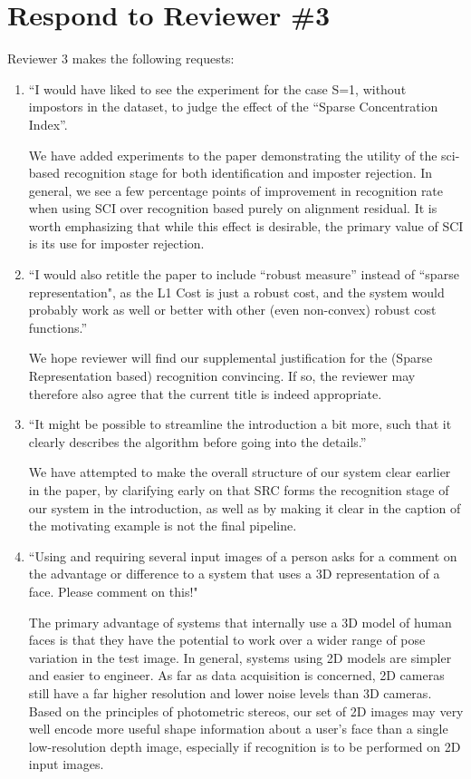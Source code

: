 \documentclass[11pt]{article}
\begin{document}
\section{Respond to Reviewer \#3}
Reviewer 3 makes the following requests:

\begin{enumerate}
\item ``I would have liked to see the experiment for the case S=1, without
impostors in the dataset, to judge the effect of the ``Sparse
Concentration Index''.

We have added experiments to the paper demonstrating the utility of the
sci-based recognition stage for both identification and imposter rejection.  In
general, we see a few percentage points of improvement in recognition rate when
using SCI over recognition based purely on alignment residual.  
It is worth emphasizing that while this effect is desirable, 
the primary value of SCI is its use for imposter rejection. 

\item ``I would also retitle the paper to include ``robust measure''
instead of ``sparse representation", as the L1 Cost is just a robust
cost, and the system would probably work as well or better with other
(even non-convex) robust cost functions.''

We hope reviewer will find our supplemental justification for the (Sparse
Representation based) recognition convincing.  If so, the reviewer may
therefore also agree that the current title is indeed appropriate.

\item ``It might be possible to streamline the introduction a bit more, such that it
clearly describes the algorithm before going into the details.''

We have attempted to make the overall structure of our system clear earlier in the
paper, by clarifying early on that SRC forms the recognition stage of our system
in the introduction, as well as by making it clear in the caption of the motivating example
is not the final pipeline.

\item ``Using and requiring several input images of a person asks for a
comment on the advantage or difference to a system that uses
a 3D representation of a face. Please comment on this!"

The primary advantage of systems that internally use a 3D model of human faces
is that they have the potential to work over a wider range of pose variation in
the test image.  In general, systems using 2D models are simpler and easier to
engineer.  As far as data acquisition is concerned, 2D cameras still have a far
higher resolution and lower noise levels than 3D cameras.  Based on the principles
of photometric stereos, our set of 2D images may very well encode more useful shape 
information about a user's face than a single low-resolution depth image, especially if 
recognition is to be performed on 2D input images.


\end{enumerate}
\end{document}

